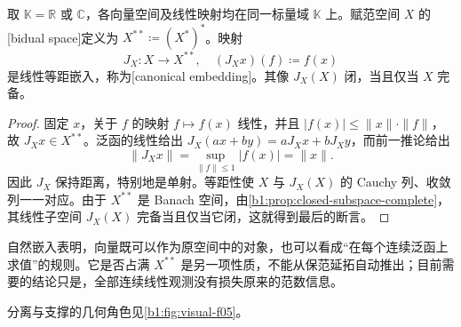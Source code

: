\begin{proposition}\label{b1:prop:canonical-embedding}
取 \(\mathbb K=\mathbb R\) 或 \(\mathbb C\)，各向量空间及线性映射均在同一标量域 \(\mathbb K\) 上。赋范空间 \(X\) 的[bidual space]定义为 \(X^{**}\coloneqq(X^*)^*\)。映射
\[
J_X:X\longrightarrow X^{**},
\quad (J_Xx)(f)\coloneqq f(x)
\]
是线性等距嵌入，称为[canonical embedding]。其像 \(J_X(X)\) 闭，当且仅当 \(X\) 完备。
\end{proposition}
\begin{proof}
固定 \(x\)，关于 \(f\) 的映射 \(f\mapsto f(x)\) 线性，并且 \(|f(x)|\leq\|x\|\cdot\|f\|\)，故 \(J_Xx\in X^{**}\)。泛函的线性给出 \(J_X(ax+by)=aJ_Xx+bJ_Xy\)，而前一推论给出
\[
\|J_Xx\|=\sup_{\|f\|\leq1}|f(x)|=\|x\|.
\]
因此 \(J_X\) 保持距离，特别地是单射。等距性使 \(X\) 与 \(J_X(X)\) 的 Cauchy 列、收敛列一一对应。由于 \(X^{**}\) 是 Banach 空间，由\cref{b1:prop:closed-subspace-complete}，其线性子空间 \(J_X(X)\) 完备当且仅当它闭，这就得到最后的断言。
\end{proof}

自然嵌入表明，向量既可以作为原空间中的对象，也可以看成“在每个连续泛函上求值”的规则。它是否占满 \(X^{**}\) 是另一项性质，不能从保范延拓自动推出；目前需要的结论只是，全部连续线性观测没有损失原来的范数信息。

分离与支撑的几何角色见\cref{b1:fig:visual-f05}。

